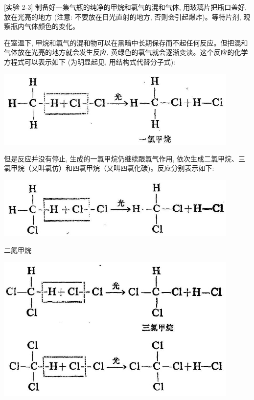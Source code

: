 \documentclass[10pt]{article}
\begin{document}
[实验 2-3] 制备好一集气瓶的纯净的甲烷和氯气的混和气体, 用玻璃片把瓶口盖好, 放在光亮的地方 (注意: 不要放在日光直射的地方, 否则会引起爆炸)。等待片剂, 观察瓶内气体颜色的变化。

在室温下, 甲烷和氯气的混和物可以在黑暗中长期保存而不起任何反应。但把混和气体放在光亮的地方就会发生反应, 黄绿色的氯气就会逐渐变淡。这个反应的化学方程式可以表示如下 (为明显起见, 用结构式代替分子式):

\begin{center}
\includegraphics[max width=0.9\textwidth]{images/01912d16-be99-77bb-9535-4f3ed8d9946f_56_925762.jpg}
\end{center}

但是反应并没有停止, 生成的一氯甲烷仍继续跟氯气作用, 依次生成二氯甲烷、三氯甲烷（又叫氯仿）和四氯甲烷（又叫四氯化碳)。反应分别表示如下:

\begin{center}
\includegraphics[max width=0.9\textwidth]{images/01912d16-be99-77bb-9535-4f3ed8d9946f_56_389751.jpg}
\end{center}

二氮甲烷

\begin{center}
\includegraphics[max width=0.9\textwidth]{images/01912d16-be99-77bb-9535-4f3ed8d9946f_57_447054.jpg}
\end{center}
\end{document}
